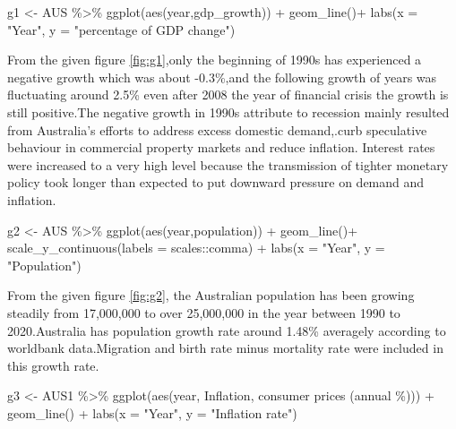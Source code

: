 \documentclass[11pt,a4paper,]{article}
\newenvironment{Shaded}{\begin{snugshade}}{\end{snugshade}}
\newcommand{\AttributeTok}[1]{\textcolor[rgb]{0.77,0.63,0.00}{#1}}
\newcommand{\FunctionTok}[1]{\textcolor[rgb]{0.00,0.00,0.00}{#1}}
\newcommand{\NormalTok}[1]{#1}
\newcommand{\OtherTok}[1]{\textcolor[rgb]{0.56,0.35,0.01}{#1}}
\newcommand{\SpecialCharTok}[1]{\textcolor[rgb]{0.00,0.00,0.00}{#1}}
\newcommand{\StringTok}[1]{\textcolor[rgb]{0.31,0.60,0.02}{#1}}
\begin{document}
\begin{Shaded}
\begin{Highlighting}[]
\NormalTok{g1 }\OtherTok{\textless{}{-}}\NormalTok{ AUS }\SpecialCharTok{\%\textgreater{}\%} 
  \FunctionTok{ggplot}\NormalTok{(}\FunctionTok{aes}\NormalTok{(year,gdp\_growth)) }\SpecialCharTok{+}
  \FunctionTok{geom\_line}\NormalTok{()}\SpecialCharTok{+}
  \FunctionTok{labs}\NormalTok{(}\AttributeTok{x =} \StringTok{"Year"}\NormalTok{,}
       \AttributeTok{y =} \StringTok{"percentage of GDP change"}\NormalTok{)}
\end{Highlighting}
\end{Shaded}

From the given figure \ref{fig:g1},only the beginning of 1990s has experienced a negative growth which was about -0.3\%,and the following growth of years was fluctuating around 2.5\% even after 2008 the year of financial crisis the growth is still positive.The negative growth in 1990s attribute to recession mainly resulted from Australia's efforts to address excess domestic demand,.curb speculative behaviour in commercial property markets and reduce inflation. Interest rates were increased to a very high level because the transmission of tighter monetary policy took longer than expected to put downward pressure on demand and inflation.

\begin{Shaded}
\begin{Highlighting}[]
\NormalTok{g2 }\OtherTok{\textless{}{-}}\NormalTok{ AUS }\SpecialCharTok{\%\textgreater{}\%} 
  \FunctionTok{ggplot}\NormalTok{(}\FunctionTok{aes}\NormalTok{(year,population)) }\SpecialCharTok{+}
  \FunctionTok{geom\_line}\NormalTok{()}\SpecialCharTok{+}
  \FunctionTok{scale\_y\_continuous}\NormalTok{(}\AttributeTok{labels =}\NormalTok{ scales}\SpecialCharTok{::}\NormalTok{comma) }\SpecialCharTok{+}
  \FunctionTok{labs}\NormalTok{(}\AttributeTok{x =} \StringTok{"Year"}\NormalTok{,}
       \AttributeTok{y =} \StringTok{"Population"}\NormalTok{)}
\end{Highlighting}
\end{Shaded}

From the given figure \ref{fig:g2}, the Australian population has been growing steadily from 17,000,000 to over 25,000,000 in the year between 1990 to 2020.Australia has population growth rate around 1.48\% averagely according to worldbank data.Migration and birth rate minus mortality rate were included in this growth rate.

\begin{Shaded}
\begin{Highlighting}[]
\NormalTok{g3 }\OtherTok{\textless{}{-}}\NormalTok{ AUS1 }\SpecialCharTok{\%\textgreater{}\%}
  \FunctionTok{ggplot}\NormalTok{(}\FunctionTok{aes}\NormalTok{(year,  }\StringTok{\textasciigrave{}}\AttributeTok{Inflation, consumer prices (annual \%)}\StringTok{\textasciigrave{}}\NormalTok{)) }\SpecialCharTok{+}
  \FunctionTok{geom\_line}\NormalTok{() }\SpecialCharTok{+}
  \FunctionTok{labs}\NormalTok{(}\AttributeTok{x =} \StringTok{"Year"}\NormalTok{,}
       \AttributeTok{y =} \StringTok{"Inflation rate"}\NormalTok{)}
\end{Highlighting}
\end{Shaded}
\end{document}
